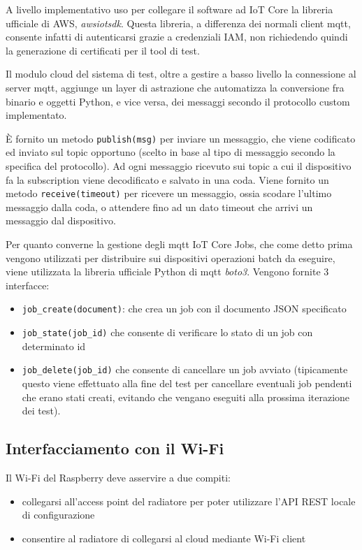 \documentclass[12pt,a4paper,twoside,titlepage]{book}
\begin{document}
A livello implementativo uso per collegare il software ad IoT Core
la libreria ufficiale di AWS, \textit{awsiotsdk}. Questa libreria, a differenza dei
normali client \Gls{mqtt}, consente infatti di autenticarsi grazie a credenziali IAM, non
richiedendo quindi la generazione di certificati per il tool di test.

Il modulo cloud del sistema di test, oltre a gestire a basso livello la connessione
al server \Gls{mqtt}, aggiunge un layer di astrazione che automatizza la conversione fra
binario e oggetti Python, e vice versa, dei messaggi secondo il protocollo custom
implementato.

È fornito un metodo \texttt{publish(msg)} per inviare un messaggio, che viene codificato ed
inviato sul \gls{topic} opportuno (scelto in base al tipo di messaggio secondo la specifica
del protocollo). Ad ogni messaggio ricevuto sui \gls{topic} a cui il dispositivo fa la
subscription viene decodificato e salvato in una coda. Viene fornito un metodo \texttt{receive(timeout)}
per ricevere un messaggio, ossia scodare l'ultimo messaggio dalla coda, o attendere
fino ad un dato timeout che arrivi un messaggio dal dispositivo.

Per quanto converne la gestione degli \Gls{mqtt} IoT Core Jobs, che come detto prima vengono
utilizzati per distribuire sui dispositivi operazioni batch da eseguire, viene
utilizzata la libreria ufficiale Python di \Gls{mqtt} \textit{boto3}. Vengono fornite
3 interfacce:
\begin{itemize}
    \item \texttt{job\_create(document)}: che crea un job con il documento JSON specificato
    \item \texttt{job\_state(job\_id)} che consente di verificare lo stato di un job con determinato id
    \item \texttt{job\_delete(job\_id)} che consente di cancellare un job avviato (tipicamente
        questo viene effettuato alla fine del test per cancellare eventuali job pendenti che
        erano stati creati, evitando che vengano eseguiti alla prossima iterazione dei test).
\end{itemize}

\subsection{Interfacciamento con il Wi-Fi}

Il Wi-Fi del Raspberry deve asservire a due compiti:
\begin{itemize}
    \item collegarsi all'access point del radiatore per poter utilizzare l'API REST locale di configurazione
    \item consentire al radiatore di collegarsi al cloud mediante Wi-Fi client
\end{itemize}
\end{document}
